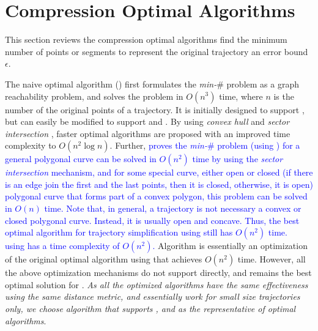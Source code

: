 \section{Compression Optimal Algorithms}
\label{sec-optimal}

This section reviews the compression optimal \lsa algorithms find the minimum number of points or segments to represent the original trajectory \wrt an error bound $\epsilon$.

The naive optimal algorithm (\opt) \cite{Imai:Optimal} first formulates the \emph{min-$\#$} problem as a graph reachability problem, and solves the problem in  $O(n^3)$ time, where $n$ is the number of the original points of a trajectory. It is initially designed to support \ped, but can easily be modified to support \sed and \dad.
By using \textit{convex hull} \cite{Toussaint:Optimal} and \textit{sector intersection} \cite{Melkman:Optimal}, faster optimal algorithms are proposed with an improved time complexity to $O(n^2 \log n)$. Further, \cite{Chan:Optimal} \textcolor{blue}{proves the \emph{min-$\#$} problem (using \ped) for a general polygonal curve can be solved in $O(n^2)$ time by using the \textit{sector intersection} mechanism, and for some special curve, either open or closed (if there is an edge join the first and the last points, then it is closed, otherwise, it is open) polygonal curve that forms part of a convex polygon, this problem can be solved in $O(n)$ time. Note that, in general, a trajectory is not necessary a convex or closed polygonal curve. Instead, it is usually open and concave. Thus, the best optimal algorithm for trajectory simplification using \ped still has $O(n^2)$ time.} 
%
\textcolor{blue}{\optss~\cite{Chen:Fast} using \lissed has a time complexity of $O(n^2)$.}
%
Algorithm  \cite{Long:Direction} is essentially an optimization of the original optimal algorithm using \dad that achieves $O(n^2)$ time. 
%
However, all the above optimization mechanisms do not support \sed directly, and \opt remains the best optimal solution for \sed . {\em As all the optimized algorithms have the same effectiveness using the same distance metric, and essentially work for small size trajectories only, we choose algorithm \opt that supports \ped, \sed and \dad as the representative of optimal \lsa algorithms}.



